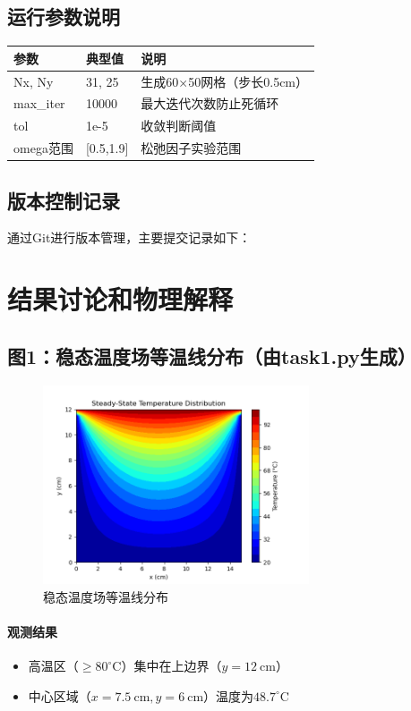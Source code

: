 \documentclass[UTF8]{ctexart}
\begin{document}
\subsection{运行参数说明}
\begin{tabular}{|>{\ttfamily}l|l|p{8cm}|}
    \hline
    \rmfamily 参数 & 典型值 & 说明 \\
    \hline
    Nx, Ny & 31, 25 & 生成60×50网格（步长0.5cm） \\
    max\_iter & 10000 & 最大迭代次数防止死循环 \\
    tol & 1e-5 & 收敛判断阈值 \\
    omega范围 & [0.5,1.9] & 松弛因子实验范围 \\
    \hline
\end{tabular}

\subsection{版本控制记录}
通过Git进行版本管理，主要提交记录如下：


\section{结果讨论和物理解释}

\subsection{图1：稳态温度场等温线分布（由task1.py生成）}
\begin{figure}[h]
    \centering
    \includegraphics[width=0.7\textwidth]{Figure_1.png}
    \caption{稳态温度场等温线分布}
    \label{fig:contour}
\end{figure}

\paragraph{观测结果}
\begin{itemize}[leftmargin=2em]
    \item 高温区（$\geq80^\circ$C）集中在上边界（$y=12\ \mathrm{cm}$）
    \item 中心区域（$x=7.5\ \mathrm{cm}, y=6\ \mathrm{cm}$）温度为$48.7^\circ$C
\end{itemize}
\end{document}
